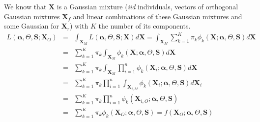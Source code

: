 \documentclass[12pt,a4paper]{report}
\begin{document}
%		

We know that $\boldsymbol{X}$ is a Gaussian mixture ({\it iid} individuals, vectors of orthogonal Gaussian mixtures $\boldsymbol{X}_f$ and linear combinations of these Gaussian mixtures and some Gaussian for $\boldsymbol{X}_r$) with $K$ the number of its components.
\begin{eqnarray}
	L(\boldsymbol{\alpha},\Theta,\boldsymbol{S};\boldsymbol{X}_O)&=&\int_{\boldsymbol{X}_M}L(\boldsymbol{\alpha},\Theta,\boldsymbol{S};\boldsymbol{X})d\boldsymbol{X} 
	=\int_{\boldsymbol{X}_M}\sum_{k=1}^K \pi_k \phi_k(\boldsymbol{X};\boldsymbol{\alpha},\Theta,\boldsymbol{S})d\boldsymbol{X} \\
	&=&\sum_{k=1}^K \pi_k \int_{\boldsymbol{X}_M}\phi_k(\boldsymbol{X};\boldsymbol{\alpha},\Theta,\boldsymbol{S})d\boldsymbol{X} \\
	&=&\sum_{k=1}^K \pi_k \int_{\boldsymbol{X}_M}\prod_{i=1}^n\phi_k(\boldsymbol{X}_i;\boldsymbol{\alpha},\Theta,\boldsymbol{S})d\boldsymbol{X} \\
	&=&\sum_{k=1}^K \pi_k \prod_{i=1}^n\int_{\boldsymbol{X}_{i,M}}\phi_k(\boldsymbol{X}_i;\boldsymbol{\alpha},\Theta,\boldsymbol{S})d\boldsymbol{X}_i \\
	&=&\sum_{k=1}^K \pi_k \prod_{i=1}^n\phi_k(\boldsymbol{X}_{i,O};\boldsymbol{\alpha},\Theta,\boldsymbol{S})\\
	&=&\sum_{k=1}^K \pi_k \phi_k(\boldsymbol{X}_{O};\boldsymbol{\alpha},\Theta,\boldsymbol{S})=f(\boldsymbol{X}_{O};\boldsymbol{\alpha},\Theta,\boldsymbol{S})
\end{eqnarray}
\end{document}
